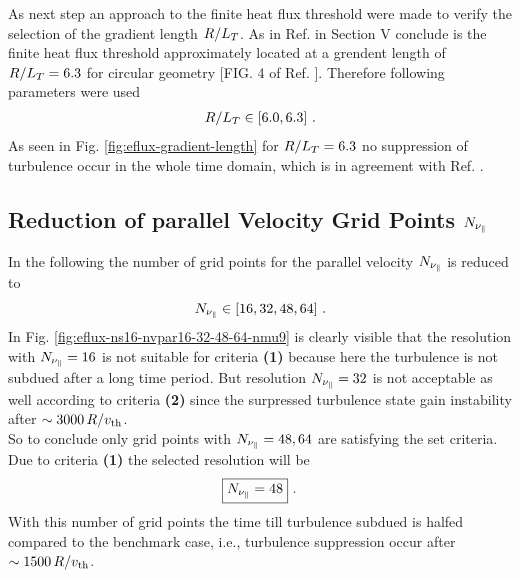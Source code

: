 As next step an approach to the finite heat flux threshold were made to verify the selection of the gradient length $R/L_T$. As in Ref.  in Section V conclude is the finite heat flux threshold approximately located at a grendent length of $R/L_T = 6.3$ for circular geometry [FIG. 4 of Ref. ]. Therefore following parameters were used
\begin{gather*}
	R/L_T \in [6.0, 6.3]~.
\end{gather*}
As seen in Fig. \ref{fig:eflux-gradient-length} for $R/L_T = 6.3$ no suppression of turbulence occur in the whole time domain, which is in agreement with Ref. .


\subsection{Reduction of parallel Velocity Grid Points $N_{\nu_\parallel}$}
\label{sub:reduceNvpar}

In the following the number of grid points for the parallel velocity $N_{\nu_\parallel}$ is reduced to
\begin{gather*}
	N_{\nu_\parallel} \in [16, 32, 48, 64]~.
\end{gather*}
In Fig. \ref{fig:eflux-ns16-nvpar16-32-48-64-nmu9} is clearly visible that the resolution with $N_{\nu_\parallel} = 16$ is not suitable for criteria \textbf{(1)} because here the turbulence is not subdued after a long time period. But resolution $N_{\nu_\parallel} = 32$ is not acceptable as well according to criteria \textbf{(2)} since the surpressed turbulence state gain instability after $\sim 3000\,R/v_{\mathrm{th}}$.\\
So to conclude only grid points with $N_{\nu_\parallel} = 48, 64$ are satisfying the set criteria. Due to criteria \textbf{(1)} the selected resolution will be
\begin{gather*}
	\boxed{N_{\nu_\parallel} = 48}~.
\end{gather*}
With this number of grid points the time till turbulence subdued is halfed compared to the benchmark case, i.e., turbulence suppression occur after $\sim 1500\,R/v_{\mathrm{th}}$.


